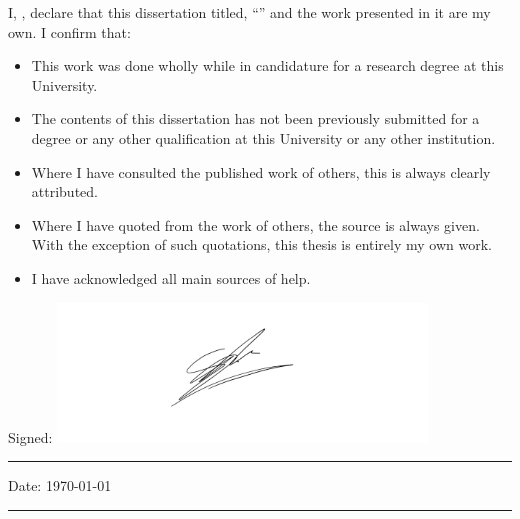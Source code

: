 \documentclass[
12pt, %
english, %
singlespacing, %
parskip, %
headsepline, %
openany %
]{MastersDoctoralThesis} %
\numberwithin{theorem}{section}
\numberwithin{remark}{section}
\numberwithin{assumption}{section}
\begin{document}
\begin{declaration}
\addchaptertocentry{\authorshipname} 
\vspace{1.5cm}

\noindent I, \authorname, declare that this dissertation titled, \enquote{\ttitle} and the work presented in it are my own. I confirm that:

\begin{itemize} 
\item This work was done wholly while in candidature for a research degree at this University.
\item The contents of this dissertation has not been previously submitted for a degree or any other qualification at this University or any other institution.
\item Where I have consulted the published work of others, this is always clearly attributed.
\item Where I have quoted from the work of others, the source is always given. With the exception of such quotations, this thesis is entirely my own work.
\item I have acknowledged all main sources of help.
\end{itemize}

\vspace{1cm}
\noindent Signed: \includegraphics[height=10em]{Figures/sig.png} \\ %
\rule[0.5em]{25em}{0.5pt} %
 
\noindent Date: \today \\
\rule[0.5em]{25em}{0.5pt} %
\end{declaration}

\cleardoublepage

\end{document}
